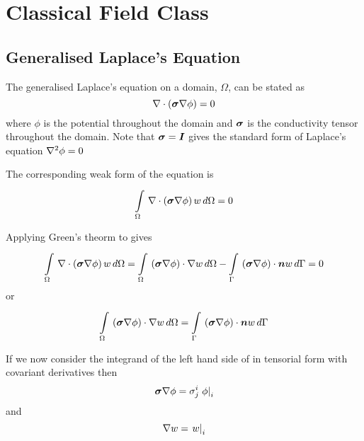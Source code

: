\section{Classical Field Class}

\subsection{Generalised Laplace's Equation}

The generalised Laplace's equation on a domain, $\Omega$, can be stated as
\begin{equation}
   \nabla\cdot\left( \boldsymbol{\sigma}\nabla\phi \right) =0
  \label{eqn:Laplacesequation}
\end{equation}
where $\phi$ is the potential throughout the domain and $\boldsymbol{\sigma}$ is
the conductivity tensor throughout the domain. Note that 
$\boldsymbol{\sigma}=\boldsymbol{I}$ gives the standard form of Laplace's equation \ie $\nabla^{2} {\phi}=0$

The corresponding weak form of the equation  is
\begin{equation}
    \displaystyle\int\limits_{\Omega}^{} \, \nabla\cdot\left( \boldsymbol{\sigma}\nabla\phi \right) w\,d\Omega =0
  \label{eqn:Laplaceweakform}
\end{equation}

Applying Green's theorm to  gives
\begin{equation}
  \gint{\Omega}{}{\diverg{\pbrac{\tensor{\sigma}\grad\phi}}w}{\Omega}= 
  \gint{\Omega}{}{\dotprod{\pbrac{\tensor{\sigma}\grad\phi}}{\grad w}}{\Omega}-
  \gint{\Gamma}{}{\dotprod{\pbrac{\tensor{\sigma}\grad\phi}}{\vect{n}}w}{\Gamma}
  =0
\end{equation}
or
\begin{equation}
  \gint{\Omega}{}{\dotprod{\pbrac{\tensor{\sigma}\grad\phi}}{\grad w}}{\Omega}=
  \gint{\Gamma}{}{\dotprod{\pbrac{\tensor{\sigma}\grad\phi}}{\vect{n}w}}{\Gamma}
  \label{eqn:Laplaceweightedresidualform}
\end{equation}

If we now consider the integrand of the left hand side of
 in tensorial form with covariant
derivatives then
\begin{equation}
  \boldsymbol{\sigma}\nabla\phi = \sigma^{i}_{j} \left. \phi \right|_{i} 
\end{equation}
and
\begin{equation}
  \nabla w =  \left. w \right|_{i} 
\end{equation}

